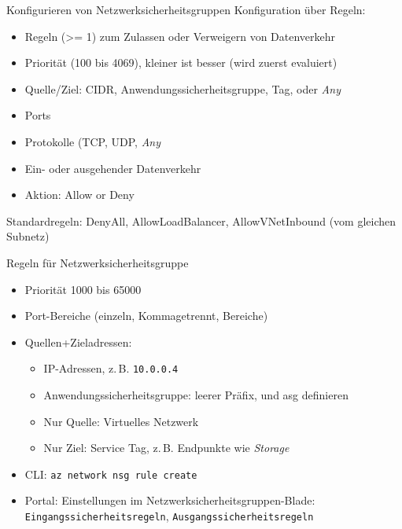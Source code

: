 \begin{flashcard}[Definition]{Konfigurieren von Netzwerksicherheitsgruppen}
    Konfiguration über Regeln:
    \begin{itemize}
        \item Regeln (>= 1) zum Zulassen oder Verweigern von Datenverkehr
        \item Priorität (100 bis 4069), kleiner ist besser (wird zuerst evaluiert)
        \item Quelle/Ziel: CIDR, Anwendungssicherheitsgruppe, Tag, oder \emph{Any}
        \item Ports
        \item Protokolle (TCP, UDP, \emph{Any}
        \item Ein- oder ausgehender Datenverkehr
        \item Aktion: Allow or Deny
    \end{itemize}
    Standardregeln: DenyAll, AllowLoadBalancer, AllowVNetInbound (vom gleichen Subnetz)
\end{flashcard}

\begin{flashcard}[Definition]{Regeln für Netzwerksicherheitsgruppe}
    \begin{itemize}
        \item Priorität 1000 bis 65000
        \item Port-Bereiche (einzeln, Kommagetrennt, Bereiche)
        \item Quellen+Zieladressen:
        \begin{itemize}
            \item IP-Adressen, z.\,B. \texttt{10.0.0.4}
            \item Anwendungssicherheitsgruppe: leerer Präfix, und asg definieren
            \item Nur Quelle: Virtuelles Netzwerk
            \item Nur Ziel: Service Tag, z.\,B. Endpunkte wie \emph{Storage}
        \end{itemize}
        \item CLI: \texttt{az network nsg rule create}
        \item Portal: Einstellungen im Netzwerksicherheitsgruppen-Blade:\newline
            \texttt{Eingangssicherheitsregeln}, \texttt{Ausgangssicherheitsregeln}
    \end{itemize}
\end{flashcard}

